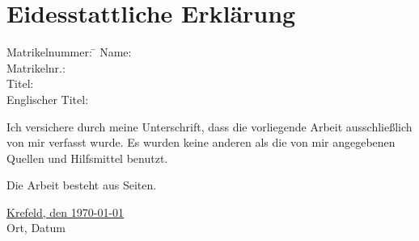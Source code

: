 \section*{Eidesstattliche Erklärung}

\begin{tabbing}
	Matrikelnummer: \= \kill
	Name: \> \thesisAuthor\\
	Matrikelnr.: \> \Matrikelnummer\\
	Titel: \> \thesisTitle\\
	Englischer Titel: \> \thesisTitleEnglish\\
\end{tabbing}

Ich versichere durch meine Unterschrift, dass die vorliegende Arbeit ausschließlich von mir verfasst wurde.
Es wurden keine anderen als die von mir angegebenen Quellen und Hilfsmittel benutzt.

Die Arbeit besteht aus \underline{\hspace{3em}} Seiten.

\vspace{6ex}
\begin{tabbing}
\underline{Krefeld, den \today \hspace{4em}} \hspace{6em}\= \underline{\hspace{14em}} \\
Ort, Datum \> \thesisAuthor
\end{tabbing}


